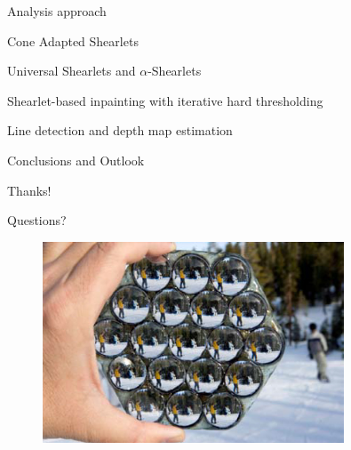 \begin{frame}{Analysis approach}
\begin{block}{}
\begin{algorithm2e}[H]

    \caption{Inpainting via $\ell^1$-minimization}
\end{algorithm2e}
\end{block}
\end{frame}

\begin{frame}{Cone Adapted Shearlets}

\end{frame}

\begin{frame}{Universal Shearlets and $\alpha$-Shearlets}

\end{frame}

\begin{frame}{Shearlet-based inpainting with iterative hard thresholding}

\end{frame}

\begin{frame}{Line detection and depth map estimation}

\end{frame}

\begin{frame}{Conclusions and Outlook}

\end{frame}

\begin{frame}{Thanks!}
\begin{center}
\Large{Questions?}
\end{center}
\begin{figure}[h!]
\centering
\includegraphics[width=0.8\textwidth]{./Images/lf-camera.jpg}
\end{figure}
\end{frame}

